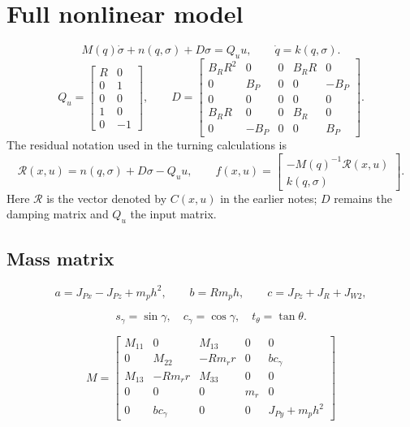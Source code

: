 \documentclass[10pt]{article}
\numberwithin{equation}{section}
\begin{document}


\section{Full nonlinear model}
\begin{equation}
\boxed{M(q)\dot\sigma+n(q,\sigma)+D\sigma=Q_u u,\qquad \dot q=k(q,\sigma).}
\end{equation}
\begin{equation}
Q_u=\begin{bmatrix}R&0\\0&1\\0&0\\1&0\\0&-1\end{bmatrix},\qquad
D=\begin{bmatrix}
B_RR^2&0&0&B_RR&0\\0&B_P&0&0&-B_P\\0&0&0&0&0\\
B_RR&0&0&B_R&0\\0&-B_P&0&0&B_P
\end{bmatrix}.
\end{equation}
The residual notation used in the turning calculations is
\begin{equation}
\mathcal R(x,u)=n(q,\sigma)+D\sigma-Q_u u,\qquad
f(x,u)=\begin{bmatrix}-M(q)^{-1}\mathcal R(x,u)\\k(q,\sigma)\end{bmatrix}.
\end{equation}
Here $\mathcal R$ is the vector denoted by $C(x,u)$ in the earlier notes;
$D$ remains the damping matrix and $Q_u$ the input matrix.
\subsection*{Mass matrix}
\begin{equation}a=J_{Px}-J_{Pz}+m_ph^2,\qquad b=Rm_ph,\qquad c=J_{Pz}+J_R+J_{W2},\end{equation}

\begin{equation}s_\gamma=\sin\gamma,\quad c_\gamma=\cos\gamma,\quad t_\theta=\tan\theta.\end{equation}

\begin{equation}
\boxed{M=\begin{bmatrix}
M_{11}&0&M_{13}&0&0\\
0&M_{22}&-Rm_rr&0&bc_\gamma\\
M_{13}&-Rm_rr&M_{33}&0&0\\
0&0&0&m_r&0\\
0&bc_\gamma&0&0&J_{Py}+m_ph^2
\end{bmatrix}}
\end{equation}
\end{document}
